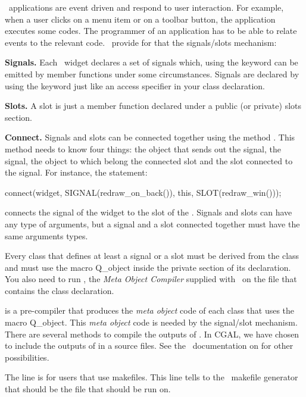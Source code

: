 \qt\ applications are event driven and respond to user interaction.
For example, when a user clicks on a menu item or on a toolbar button,
the application executes some codes. The programmer of an
application has to be able to relate events to the relevant code.
\qt\ provide for that the signals/slots mechanism:
\begin{description}
\item{\bf Signals.}
Each \qt\ widget declares a set of signals which, using the
keyword   can be  emitted by member functions 
under some circumstances. Signals are declared by using 
the keyword  just like an
access specifier in your class declaration.
\item {\bf Slots.}
A slot is just a member function declared under a public (or private)
slots section.
\item{\bf Connect.}
Signals and slots can be connected together using the method 
. This method needs to know four things: the object
that sends out the signal, the signal, 
the object to which belong the connected slot
and the slot connected to the signal.
For instance, the statement:
\begin{ccExampleCode}
connect(widget, SIGNAL(redraw_on_back()),
        this, SLOT(redraw_win()));
\end{ccExampleCode}

connects the signal  of the widget 
to the slot  of the  .
Signals and slots can have any type of arguments, but a signal and a
slot connected together must have the same arguments types.
\end{description}

Every class that defines at least a signal or a slot must be derived
from the class  and must use the macro {\sc Q\_object}
inside the private section of its declaration. You also need to run
, the \emph{Meta Object Compiler} supplied with \qt\, on the
file that contains the class declaration.

 is a pre-compiler that produces the \emph{meta object} code
of each class that uses the macro {\sc Q\_object}. This \emph{meta
  object} code is needed by the signal/slot mechanism. There are
several methods to compile the outputs of . In CGAL, we have
chosen to include the outputs of  in a source files. See the
\qt\ documentation on  for other possibilities.

The line  is for users that use
makefiles. This line tells to the \cgal\ makefile generator that
 should be the file that  should be run on.

